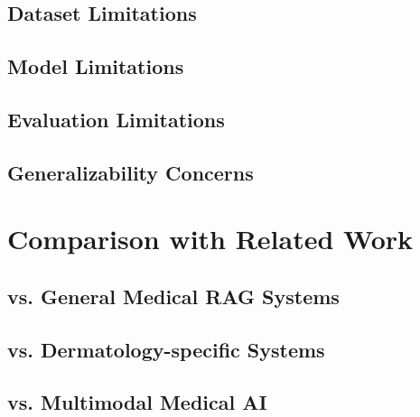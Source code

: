 \subsection{Dataset Limitations}
\label{subsec:discussion:limitations:dataset}

\subsection{Model Limitations}
\label{subsec:discussion:limitations:models}

\subsection{Evaluation Limitations}
\label{subsec:discussion:limitations:evaluation}

\subsection{Generalizability Concerns}
\label{subsec:discussion:limitations:generalizability}

%
%
\section{Comparison with Related Work}
\label{sec:discussion:related}

\subsection{vs. General Medical RAG Systems}
\label{subsec:discussion:related:general}

\subsection{vs. Dermatology-specific Systems}
\label{subsec:discussion:related:dermatology}

\subsection{vs. Multimodal Medical AI}
\label{subsec:discussion:related:multimodal}
